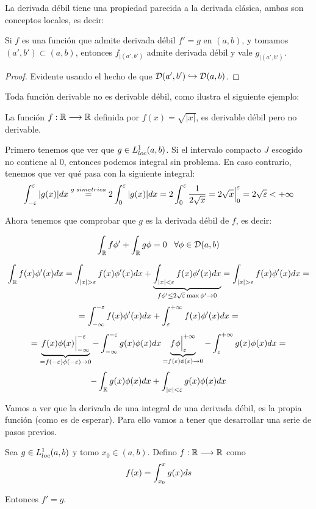 La derivada débil tiene una propiedad parecida a la derivada clásica, ambas son conceptos locales, es decir:

\begin{prop}
Si $f$ es una función que admite derivada débil $f'=g$ en $(a,b)$, y tomamos $(a',b')\subset(a,b)$, entonces $f_{|(a',b')}$ admite derivada débil y vale $g_{|(a',b')}$.
\end{prop}

\begin{proof}
Evidente usando el hecho de que $\mathcal{D}(a',b')\hookrightarrow\mathcal{D}(a,b)$.
\end{proof}

Toda función derivable no es derivable débil, como ilustra el siguiente ejemplo:

\begin{example}
La función $f : \mathbb{R} \longrightarrow \mathbb{R}$ definida por $f(x)=\sqrt{|x|}$, es derivable débil pero no derivable.

Primero tenemos que ver que $g\in L^1_{loc}(a,b)$. Si el intervalo compacto $J$ escogido no contiene al 0, entonces podemos integral sin problema. En caso contrario, tenemos que ver qué pasa con la siguiente integral:
\[
\displaystyle\int_{ -\varepsilon }^{ \varepsilon } |g(x)|dx\overset{g\; simetrica}{=}2\displaystyle\int_{ 0 }^{ \varepsilon } |g(x)|dx=2\displaystyle\int_{ 0 }^{ \varepsilon } \frac{1}{2\sqrt{x}}=2\sqrt{x}\Big|_0^\varepsilon=2\sqrt{\varepsilon}<+\infty
\]

Ahora tenemos que comprobar que $g$ es la derivada débil de $f$, es decir:

\[
\displaystyle\int_{ \mathbb{R} }^{  } f\phi'+\displaystyle\int_{ \mathbb{R} }^{  } g\phi=0 \;\;\; \forall\phi\in\mathcal{D}(a,b)
\]

\[
\integral{\R}{}{f(x)\phi'(x)dx}=\integral{|x|>\varepsilon}{}{f(x)\phi'(x)dx}+\underbrace{\integral{|x|<\varepsilon}{}{f(x)\phi'(x)dx}}_{f\phi'\leq2\sqrt{\varepsilon}\max\phi'\to0}=\integral{|x|>\varepsilon}{}{f(x)\phi'(x)dx}=
\]
\[
=\displaystyle\int_{ -\infty }^{ -\varepsilon } f(x)\phi'(x)dx+\displaystyle\int_{ \varepsilon }^{ +\infty } f(x)\phi'(x)dx=
\]
\[
=\underbrace{f(x)\phi(x)\Big|_{-\infty}^{-\varepsilon}}_{=f(-\varepsilon)\phi(-\varepsilon)\to 0}-
\displaystyle\int_{ -\infty }^{ -\varepsilon } g(x)\phi(x) dx
\underbrace{f\phi\Big|_{\varepsilon}^{+\infty}}_{{=f(\varepsilon)\phi(\varepsilon)\to 0}}-
\displaystyle\int_{ \varepsilon }^{ +\infty } g(x)\phi(x) dx=
\]
\[
-\displaystyle\int_{ \mathbb{R} }^{  } g(x)\phi(x)dx+\displaystyle\int_{ |x|<\varepsilon }^{  } g(x)\phi(x)dx
\]

\end{example}

Vamos a ver que la derivada de una integral de una derivada débil, es la propia función (como es de esperar). Para ello vamos a tener que desarrollar una serie de pasos previos.

\begin{prop}
Sea $g\in L^1_{loc}(a,b)$ y tomo $x_0\in(a,b)$. Defino $f : \mathbb{R} \longrightarrow \mathbb{R}$ como
\[
f(x)=\displaystyle\int_{ x_0 }^{ x } g(x)ds
\]

Entonces $f'=g$.
\end{prop}

